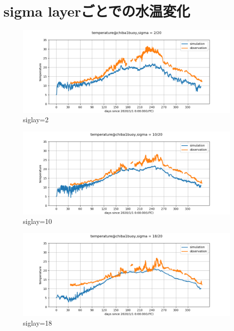 \documentclass[12pt,a4paper]{jarticle}
\begin{document}
\section{sigma layerごとでの水温変化}
\begin{figure}[hbtp]
    \centering
        \includegraphics[keepaspectratio,scale=0.5]{Tokyo3/temperature_chiba1buoy_2_Tokyo3.png}
    \caption{siglay=2}
\end{figure}

\begin{figure}[hbtp]
    \centering
        \includegraphics[keepaspectratio,scale=0.5]{Tokyo3/temperature_chiba1buoy_10_Tokyo3.png}
    \caption{siglay=10}
\end{figure}

\begin{figure}[hbtp]
    \centering
        \includegraphics[keepaspectratio,scale=0.5]{Tokyo3/temperature_chiba1buoy_18_Tokyo3.png}
    \caption{siglay=18}
\end{figure}

        
\end{document}
